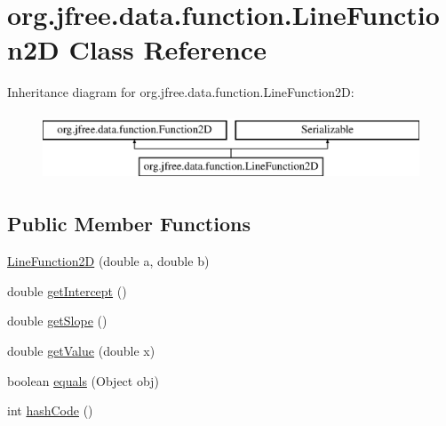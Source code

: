 \hypertarget{classorg_1_1jfree_1_1data_1_1function_1_1_line_function2_d}{}\section{org.\+jfree.\+data.\+function.\+Line\+Function2D Class Reference}
\label{classorg_1_1jfree_1_1data_1_1function_1_1_line_function2_d}
Inheritance diagram for org.\+jfree.\+data.\+function.\+Line\+Function2D\+:\begin{figure}[H]
\begin{center}
\leavevmode
\includegraphics[height=2.000000cm]{classorg_1_1jfree_1_1data_1_1function_1_1_line_function2_d}
\end{center}
\end{figure}
\subsection*{Public Member Functions}
\begin{DoxyCompactItemize}
\item 
\mbox{\hyperlink{classorg_1_1jfree_1_1data_1_1function_1_1_line_function2_d_a108443680e89b4a79393d997d0539114}{Line\+Function2D}} (double a, double b)
\item 
double \mbox{\hyperlink{classorg_1_1jfree_1_1data_1_1function_1_1_line_function2_d_a11ae023ff3f68ba1cd5b1777dc52b9fa}{get\+Intercept}} ()
\item 
double \mbox{\hyperlink{classorg_1_1jfree_1_1data_1_1function_1_1_line_function2_d_ae4d72a69718f87825d222809f42cf847}{get\+Slope}} ()
\item 
double \mbox{\hyperlink{classorg_1_1jfree_1_1data_1_1function_1_1_line_function2_d_a964dd87401e1f11453022c5a95566657}{get\+Value}} (double x)
\item 
boolean \mbox{\hyperlink{classorg_1_1jfree_1_1data_1_1function_1_1_line_function2_d_a3bf5c2bfbb7c4b0f6a17ede4d1d5751c}{equals}} (Object obj)
\item 
int \mbox{\hyperlink{classorg_1_1jfree_1_1data_1_1function_1_1_line_function2_d_a40a0d5b1616f79b6db2a6d31e152e6ba}{hash\+Code}} ()
\end{DoxyCompactItemize}


